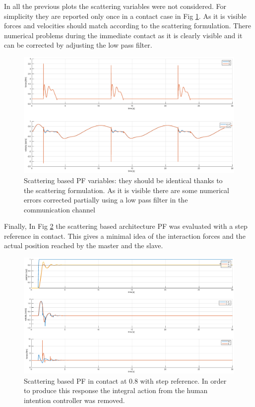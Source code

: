 \documentclass[a4paper,12pt]{article}
\begin{document}
In all the previous plots the scattering variables were not considered. For simplicity they are reported only once in a contact case in Fig \ref{fig:scat_var}. As it is visible forces and velocities should match according to the scattering formulation. There numerical problems during the immediate contact as it is clearly visible and it can be corrected by adjusting the low pass filter.
\begin{figure}[H]
    \begin{center}
        \hspace*{-4.5cm}
        \includegraphics[scale=0.5]{images/scatt_pf.eps}
    \end{center}
    \caption{Scattering based PF variables: they should be identical thanks to the scattering formulation. As it is visible there are some numerical errors corrected partially using a low pass filter in the communication channel}
    \label{fig:scat_var}
\end{figure}

Finally, In Fig \ref{fig:scatt_pf_step} the scattering based architecture PF was evaluated with a step reference in contact. This gives a minimal idea of the interaction forces and the actual position reached by the master and the slave.

\begin{figure}[H]
    \begin{center}
        \hspace*{-4.5cm}
        \includegraphics[scale=0.5]{images/scatt_pf_step.eps}
    \end{center}
    \caption{Scattering based PF in contact at 0.8 with step reference. In order to produce this response the integral action from the human intention controller was removed.}
    \label{fig:scatt_pf_step}
\end{figure}
\end{document}
